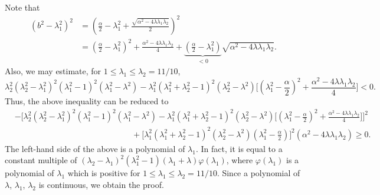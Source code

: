 \documentclass[11pt]{amsart}
\numberwithin{equation}{section}
\numberwithin{figure}{section}
\theoremstyle{plain} %
\theoremstyle{definition} %
\begin{document}
Note that 
\begin{align*}
(b^2-\lambda_1^2)^2 
&= \left(\frac{\alpha}{2}-\lambda_1^2+\frac{\sqrt{\alpha^2-4\lambda\lambda_1\lambda_2}}{2}\right)^2 \\
&= \left(\frac{\alpha}{2}-\lambda_1^2\right)^2 +\frac{\alpha^2-4\lambda\lambda_1\lambda_2}{4}
+\underbrace{\left(\frac{\alpha}{2}-\lambda_1^2\right)}_{< 0}\sqrt{\alpha^2-4\lambda\lambda_1\lambda_2}. 
\end{align*}
Also, we may estimate, for $1\leq \lambda_1\leq \lambda_2=11/10$, 
\[
\lambda_2^2 (\lambda_2^2-\lambda_1^2)^2 (\lambda_1^2-1)^2 (\lambda_1^2-\lambda^2) 
-\lambda_1^2(\lambda_1^2+\lambda_2^2-1)^2 (\lambda_2^2-\lambda^2)
\bigg[ \left(\lambda_1^2-\frac{\alpha}{2}\right)^2 +\frac{\alpha^2-4\lambda\lambda_1\lambda_2}{4} \bigg]<0. 
\]
Thus, the above inequality can be reduced to 
\begin{align*}
& -\bigg[\lambda_2^2 (\lambda_2^2-\lambda_1^2)^2 (\lambda_1^2-1)^2 (\lambda_1^2-\lambda^2) %
-\lambda_1^2(\lambda_1^2+\lambda_2^2-1)^2 (\lambda_2^2-\lambda^2)
\bigg[ \left(\lambda_1^2-\frac{\alpha}{2}\right)^2 +\frac{\alpha^2-4\lambda\lambda_1\lambda_2}{4} \bigg]\bigg]^2 \\
& \hspace{170pt} +\bigg[\lambda_1^2(\lambda_1^2+\lambda_2^2-1)^2 (\lambda_2^2-\lambda^2)
\left(\lambda_1^2-\frac{\alpha}{2}\right)\bigg]^2 (\alpha^2-4\lambda\lambda_1\lambda_2)\geq 0. 
\end{align*}
The left-hand side of the above is a polynomial of $\lambda_1$. 
In fact, it is equal to a constant multiple of $(\lambda_2-\lambda_1)^2(\lambda_1^2-1)(\lambda_1+\lambda) \varphi (\lambda_1)$, 
where 
$\varphi (\lambda_1)$ is a polynomial of $\lambda_1$ 
which is positive for $1\leq \lambda_1\leq \lambda_2=11/10$. 
Since a polynomial of $\lambda$, $\lambda_1$, $\lambda_2$ is continuous, we obtain the proof. 
\end{document}
